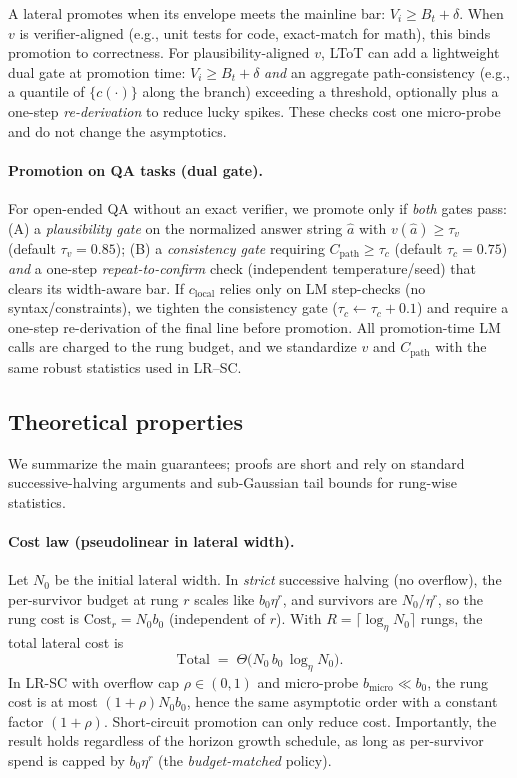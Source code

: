 \documentclass{article}
\begin{document}
A lateral promotes when its envelope meets the mainline bar: $V_i \ge B_t+\delta$.
When $v$ is verifier-aligned (e.g., unit tests for code, exact-match for math), this binds promotion to correctness.
For plausibility-aligned $v$, LToT can add a lightweight dual gate at promotion time:
$V_i\!\ge\!B_t{+}\delta$ \emph{and} an aggregate path-consistency (e.g., a quantile of $\{c(\cdot)\}$ along the branch) exceeding a threshold, optionally plus a one-step \emph{re-derivation} to reduce lucky spikes.
These checks cost one micro-probe and do not change the asymptotics.

\vspace{0.5em}
\paragraph{Promotion on QA tasks (dual gate).}
For open-ended QA without an exact verifier, we promote only if \emph{both} gates pass:
(A) a \emph{plausibility gate} on the normalized answer string $\hat a$ with $v(\hat a)\ge \tau_v$ (default $\tau_v{=}0.85$);
(B) a \emph{consistency gate} requiring $C_{\text{path}}\ge \tau_c$ (default $\tau_c{=}0.75$) \emph{and} a one-step \emph{repeat-to-confirm} check (independent temperature/seed) that clears its width-aware bar.
If $c_{\text{local}}$ relies only on LM step-checks (no syntax/constraints), we tighten the consistency gate ($\tau_c\leftarrow\tau_c{+}0.1$) and require a one-step re-derivation of the final line before promotion.
All promotion-time LM calls are charged to the rung budget, and we standardize $v$ and $C_{\text{path}}$ with the same robust statistics used in LR--SC.

\subsection{Theoretical properties}
\label{sec:theory}

We summarize the main guarantees; proofs are short and rely on standard successive-halving arguments and sub-Gaussian tail bounds for rung-wise statistics.

\paragraph{Cost law (pseudolinear in lateral width).}
Let $N_0$ be the initial lateral width.
In \emph{strict} successive halving (no overflow), the per-survivor budget at rung $r$ scales like $b_0\eta^r$, and survivors are $N_0/\eta^r$, so the rung cost is $\text{Cost}_r = N_0 b_0$ (independent of $r$).
With $R=\lceil\log_\eta N_0\rceil$ rungs, the total lateral cost is
\[
\boxed{~~\text{Total} \;=\; \Theta\!\big(N_0\,b_0\,\log_\eta N_0\big).~~}
\]
In LR-SC with overflow cap $\rho\in(0,1)$ and micro-probe $b_{\text{micro}}\ll b_0$, the rung cost is at most $(1+\rho)N_0 b_0$, hence the same asymptotic order with a constant factor $(1+\rho)$.
Short-circuit promotion can only reduce cost.
Importantly, the result holds regardless of the horizon growth schedule, as long as per-survivor spend is capped by $b_0\eta^r$ (the \emph{budget-matched} policy).
\end{document}
